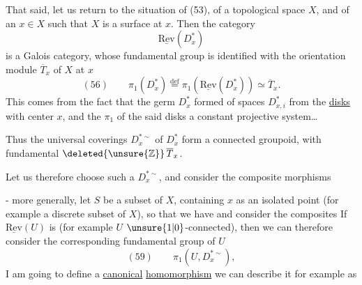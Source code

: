 
That said, let us return to the situation of (53), of a topological space $X$, and of an $x\in X$ such that $X$ is a surface at $x$. Then the category 
\[
\underline{\mathrm{Rev}}(D_x^*)
\]
is a Galois category,  whose fundamental group is identified  with the orientation module $\overline T_x$ of $X$ at $x$
\[
(56)\qquad \pi_1(D_x^*)\overset{\mathrm{def}}=\pi_1(\underline{\mathrm{Rev}}(D_x^*))\simeq\overline T_x.
\]
This comes from the fact that the germ $D_x^*$   formed of spaces $D_{x,i}^*$   from the \uline{disks} with center $x$, and the $\pi_1$ of the said disks  a constant projective system\ldots

Thus the universal coverings $D_x^{*\sim}$ of $D_x^*$ form a connected groupoid, with fundamental  $\deleted{\unsure{\mathbb{Z}}}\,\overline T_x$.

Let us therefore choose such a $D_x^{*\sim}$, and consider the composite morphisms

- more generally, let $S$ be a subset of $X$, containing $x$ as an isolated point (for example a discrete subset of $X$), so that we have
and consider the composites
If $\underline{\mathrm{Rev}}(U)$ is  (for example $U$  $\unsure{1|0}$-connected), then we can therefore consider the corresponding fundamental group of $U$
\[
(59)\qquad \pi_1(U,D_x^{*\sim}),
\]
I am going to define a \uline{canonical} \uline{homomorphism}
we can describe it for example as

